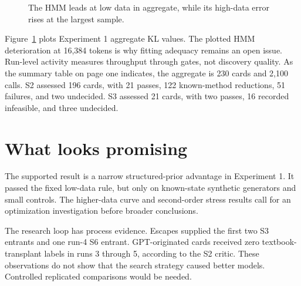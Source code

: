 \begin{figure}[ht]
\centering
{}
\caption{The HMM leads at low data in aggregate, while its high-data error rises at the largest sample.}
\label{fig:exp1}
\end{figure}

Figure~\ref{fig:exp1} plots Experiment 1 aggregate KL values. The plotted HMM deterioration at 16,384 tokens is why fitting adequacy remains an open issue. Run-level activity measures throughput through gates, not discovery quality. As the summary table on page one indicates, the aggregate is 230 cards and 2,100 calls. S2 assessed 196 cards, with 21 passes, 122 known-method reductions, 51 failures, and two undecided. S3 assessed 21 cards, with two passes, 16 recorded infeasible, and three undecided.

\section{What looks promising}

The supported result is a narrow structured-prior advantage in Experiment 1. It passed the fixed low-data rule, but only on known-state synthetic generators and small controls. The higher-data curve and second-order stress results call for an optimization investigation before broader conclusions.

The research loop has process evidence. Escapes supplied the first two S3 entrants and one run-4 S6 entrant. GPT-originated cards received zero textbook-transplant labels in runs 3 through 5, according to the S2 critic. These observations do not show that the search strategy caused better models. Controlled replicated comparisons would be needed.

